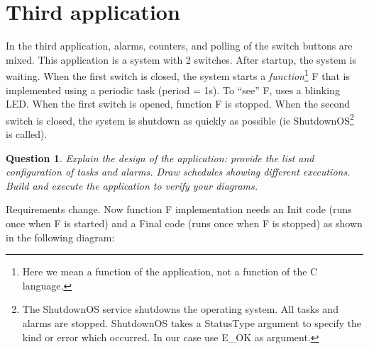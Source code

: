 \documentclass[11pt]{report}
\newtheorem{ex}{Question}
\begin{document}
\section{Third application}

In the third application, alarms, counters, and polling of the switch buttons are mixed.
This application is a system with 2 switches.
After startup, the system is waiting.
When the first switch is closed, the system starts a {\it function}\footnote{Here we mean a function of the application, not a function of the C language.} F that is implemented using a periodic task (period = 1s).
To ``see'' F, uses a blinking LED.
When the first switch is opened, function F is stopped.
When the second switch is closed, the system is shutdown as quickly as possible (ie ShutdownOS\footnote{The ShutdownOS service shutdowns the operating system. All tasks and alarms are stopped. ShutdownOS takes a StatusType argument to specify the kind or error which occurred. In our case use E\_OK as argument.} is called).

\begin{ex}
    Explain the design of the application: provide the list and configuration of tasks and alarms.
    Draw schedules showing different executions.
    Build and execute the application to verify your diagrams.
\end{ex}

Requirements change. Now function F implementation needs an Init code
(runs once when F is started) and a Final code (runs once when F is stopped) as shown in the following diagram:

\begin{center}
\end{center}
\end{document}
